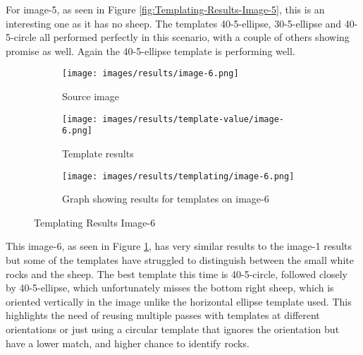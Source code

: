 For image-5, as seen in  Figure \ref{fig:Templating-Results-Image-5}, this is an interesting one as it has no sheep. The templates 40-5-ellipse, 30-5-ellipse and 40-5-circle all performed perfectly in this scenario, with a couple of others showing promise as well. Again the 40-5-ellipse template is performing well.

\begin{figure}[H]
    \centering
    
    \begin{subfigure}{0.5\textwidth}
        \centering
        \texttt{[image: images/results/image-6.png]}
        \caption{Source image}
    \end{subfigure}%
    \begin{subfigure}{0.5\textwidth}
        \centering
        \texttt{[image: images/results/template-value/image-6.png]}
        \caption{Template results}
    \end{subfigure}
    \begin{subfigure}{\textwidth}
    \centering
        \texttt{[image: images/results/templating/image-6.png]}
        \caption{Graph showing results for templates on image-6}
    \end{subfigure}
    
    \caption{Templating Results Image-6}
    \label{fig:Templating-Results-Image-6}
\end{figure}

This image-6, as seen in  Figure \ref{fig:Templating-Results-Image-6}, has very similar results to the image-1 results but some of the templates have struggled to distinguish between the small white rocks and the sheep. The best template this time is 40-5-circle, followed closely by 40-5-ellipse, which unfortunately misses the bottom right sheep, which is oriented vertically in the image unlike the horizontal ellipse template used. This highlights the need of reusing multiple passes with templates at different orientations or just using a circular template that ignores the orientation but have a lower match, and higher chance to identify rocks.

